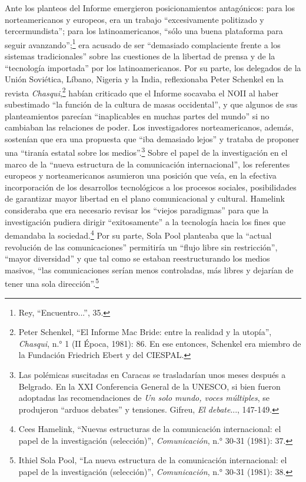 \documentclass{tufte-handout}
\begin{document}
Ante los planteos del Informe emergieron posicionamientos antagónicos:
para los norteamericanos y europeos, era un trabajo ``excesivamente
politizado y tercermundista''; para los latinoamericanos, ``sólo una
buena plataforma para seguir avanzando'';\footnote{Rey,
  ``Encuentro...'', 35.} era acusado de ser ``demasiado complaciente
frente a los sistemas tradicionales'' sobre las cuestiones de la
libertad de prensa y de la ``tecnología importada'' por los
latinoamericanos. Por su parte, los delegados de la Unión Soviética,
Líbano, Nigeria y la India, reflexionaba Peter Schenkel en la revista
\emph{Chasqui},\footnote{Peter Schenkel, ``El Informe Mac Bride: entre
  la realidad y la utopía'', \emph{Chasqui}, n.° 1 (II Época, 1981): 86.
  En ese entonces, Schenkel era miembro de la Fundación Friedrich Ebert
  y del CIESPAL.} habían criticado que el Informe socavaba el NOII al
haber subestimado ``la función de la cultura de masas occidental'', y
que algunos de sus planteamientos parecían ``inaplicables en muchas
partes del mundo'' si no cambiaban las relaciones de poder. Los
investigadores norteamericanos, además, sostenían que era una propuesta
que ``iba demasiado lejos'' y trataba de proponer una ``tiranía estatal
sobre los medios''.\footnote{Las polémicas suscitadas en Caracas se
  trasladarían unos meses después a Belgrado. En la XXI Conferencia
  General de la UNESCO, si bien fueron adoptadas las recomendaciones de
  \emph{Un solo mundo, voces múltiples}, se produjeron ``arduos
  debates'' y tensiones. Gifreu, \emph{El debate}..., 147-149.} Sobre el
papel de la investigación en el marco de la ``nueva estructura de la
comunicación internacional'', los referentes europeos y norteamericanos
asumieron una posición que veía, en la efectiva incorporación de los
desarrollos tecnológicos a los procesos sociales, posibilidades de
garantizar mayor libertad en el plano comunicacional y cultural.
Hamelink consideraba que era necesario revisar los ``viejos paradigmas''
para que la investigación pudiera dirigir ``exitosamente'' a la
tecnología hacia los fines que demandaba la sociedad.\footnote{Cees
  Hamelink, ``Nuevas estructuras de la comunicación internacional: el
  papel de la investigación (selección)'', \emph{Comunicación}, n.°
  30-31 (1981): 37.} Por su parte, Sola Pool planteaba que la ``actual
revolución de las comunicaciones'' permitiría un ``flujo libre sin
restricción'', ``mayor diversidad'' y que tal como se estaban
reestructurando los medios masivos, ``las comunicaciones serían menos
controladas, más libres y dejarían de tener una sola
dirección''.\footnote{Ithiel Sola Pool, ``La nueva estructura de la
  comunicación internacional: el papel de la investigación
  (selección)'', \emph{Comunicación}, n.° 30-31 (1981): 38.}
\end{document}
